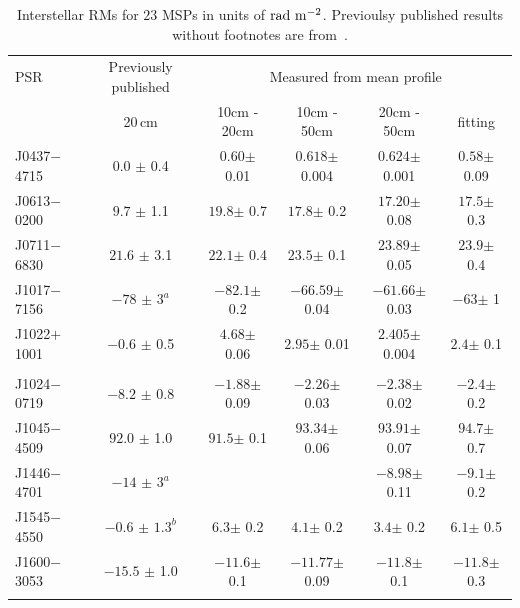 \documentclass[useAMS,usenatbib]{mn2e}
\begin{document}
\begin{table}
\centering
\caption{Interstellar RMs for $23$ MSPs in units of $\rm{rad\ m^{-2}}$. Previoulsy published results without footnotes are from~\citet{Yan11}.}
\label{rm}
\begin{tabular}{lccccc}
\hline
PSR          &    Previously published     &    \multicolumn{4}{c}{Measured from mean profile}       \\  
             &    20\,cm                   &    10cm - 20cm  &  10cm - 50cm   &  20cm - 50cm   &    fitting      \\   
\hline
J0437$-$4715 & $0.0   $ $\pm$ 0.4      & $0.60   $$\pm$ 0.01  & $0.618   $$\pm$ 0.004 &  $0.624   $$\pm$ 0.001 &  $0.58   $$\pm$ 0.09   \\  
J0613$-$0200 & $9.7   $ $\pm$ 1.1      & $19.8   $$\pm$ 0.7   & $17.8    $$\pm$ 0.2   &  $17.20   $$\pm$ 0.08  &  $17.5   $$\pm$ 0.3   \\  
J0711$-$6830 & $21.6  $ $\pm$ 3.1      & $22.1   $$\pm$ 0.4   & $23.5    $$\pm$ 0.1   &  $23.89   $$\pm$ 0.05  &  $23.9   $$\pm$ 0.4   \\  
J1017$-$7156 & $-78   $ $\pm$ $3^a$    & $-82.1  $$\pm$ 0.2   & $-66.59  $$\pm$ 0.04  &  $-61.66  $$\pm$ 0.03  &  $-63    $$\pm$ 1    \\
J1022$+$1001 & $-0.6  $ $\pm$ 0.5      & $4.68   $$\pm$ 0.06  & $2.95    $$\pm$ 0.01  &  $2.405   $$\pm$ 0.004 &  $2.4    $$\pm$ 0.1   \\  
             &                         &                      &                       &                        &                       \\
J1024$-$0719 & $-8.2  $ $\pm$ 0.8      & $-1.88  $$\pm$ 0.09  & $-2.26   $$\pm$ 0.03  &  $-2.38   $$\pm$ 0.02  &  $-2.4   $$\pm$ 0.2    \\  
J1045$-$4509 & $92.0  $ $\pm$ 1.0      & $91.5   $$\pm$ 0.1   & $93.34   $$\pm$ 0.06  &  $93.91   $$\pm$ 0.07  &  $94.7   $$\pm$ 0.7    \\  
J1446$-$4701 & $-14   $ $\pm$ $3^a$    & $       $            & $        $            &  $-8.98   $$\pm$ 0.11  &  $-9.1   $$\pm$ 0.2    \\
J1545$-$4550 & $-0.6  $ $\pm$ $1.3^b$  & $6.3    $$\pm$ 0.2   & $4.1     $$\pm$ 0.2   &  $3.4     $$\pm$ 0.2   &  $6.1    $$\pm$ 0.5    \\
J1600$-$3053 & $-15.5 $ $\pm$ 1.0      & $-11.6  $$\pm$ 0.1   & $-11.77  $$\pm$ 0.09  &  $-11.8   $$\pm$ 0.1   &  $-11.8  $$\pm$ 0.3    \\  
             &                         &                      &                       &                        &                        \\

\end{tabular}
\end{table}
\end{document}
